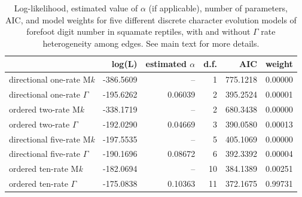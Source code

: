 \documentclass[fleqn,10pt,lineno]{wlpeerj} %
\begin{document}
\begin{table}

\caption{\label{tab:unnamed-chunk-15}Log-likelihood, estimated value of $\alpha$ (if applicable), number of parameters, AIC, and model weights for five different discrete character evolution models of forefoot digit number in squamate reptiles, with and without $\Gamma$ rate heterogeneity among edges. See main text for more details.}
\centering
\begin{tabular}[t]{l|r|r|r|r|r}
\hline
  & log(L) & estimated $\alpha$ & d.f. & AIC & weight\\
\hline
directional one-rate M\emph{k} & -386.5609 & -- & 1 & 775.1218 & 0.00000\\
\hline
directional one-rate $\Gamma$ & -195.6262 & 0.06039 & 2 & 395.2524 & 0.00001\\
\hline
ordered two-rate M\emph{k} & -338.1719 & -- & 2 & 680.3438 & 0.00000\\
\hline
ordered two-rate $\Gamma$ & -192.0290 & 0.04669 & 3 & 390.0580 & 0.00013\\
\hline
directional five-rate M\emph{k} & -197.5535 & -- & 5 & 405.1069 & 0.00000\\
\hline
directional five-rate $\Gamma$ & -190.1696 & 0.08672 & 6 & 392.3392 & 0.00004\\
\hline
ordered ten-rate M\emph{k} & -182.0694 & -- & 10 & 384.1389 & 0.00251\\
\hline
ordered ten-rate $\Gamma$ & -175.0838 & 0.10363 & 11 & 372.1675 & 0.99731\\
\hline
\end{tabular}
\end{table}
\end{document}
